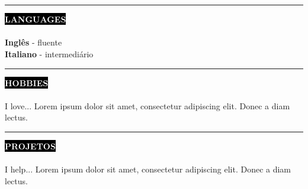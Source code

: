 \documentclass[10pt,A4]{article}
\newcounter{a}
\newcounter{b}
\newcounter{c}
\newcommand{\cvsection}[1] {
	\textcolor{white}{\MakeUppercase{\textbf{#1}}}
}
\newcommand{\cvsect}[1]{
	\colorbox{black}{{\cvsection{#1}}}\\\\%
}
\newcommand{\lorem}{Lorem ipsum dolor sit amet, consectetur adipiscing elit. Donec a diam lectus.}
\begin{document}
	\\\\
	\begin{minipage}[t]{0.3\textwidth}\hrule height 0pt width 0pt%
		\cvsect{Languages}
		\textbf{Inglês} - fluente\\
		\textbf{Italiano} - intermediário
	\end{minipage}%
	\hspace{0cm}
	\begin{minipage}[t]{0.3\textwidth}\hrule height 0pt width 0pt%
		\cvsect{Hobbies}
		I love... \lorem
	\end{minipage}%
	\hspace{2cm}
	\begin{minipage}[t]{0.3\textwidth}\hrule height 0pt width 0pt%
		\cvsect{Projetos}
		I help... \lorem
	\end{minipage}%
\end{document}
